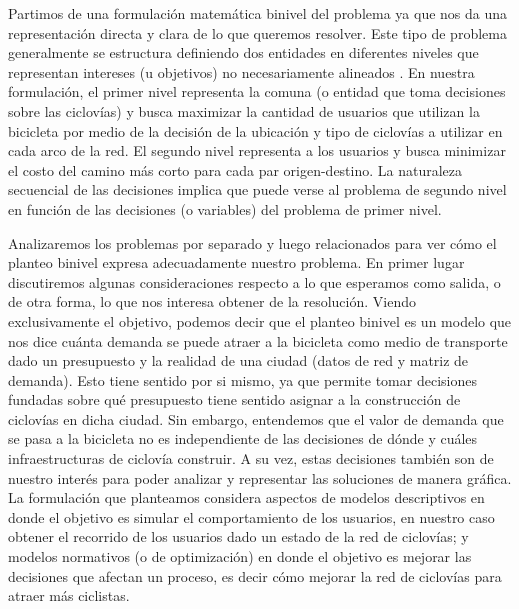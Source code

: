 \documentclass{article}
\begin{document}
  Partimos de una formulación matemática binivel del problema ya que nos da una representación directa y clara de lo que queremos resolver. Este tipo de problema generalmente se estructura definiendo dos entidades en diferentes niveles que representan intereses (u objetivos) no necesariamente alineados \cite{bardbook}. En nuestra formulación, el primer nivel representa la comuna (o entidad que toma decisiones sobre las ciclovías) y busca maximizar la cantidad de usuarios que utilizan la bicicleta por medio de la decisión de la ubicación y tipo de ciclovías a utilizar en cada arco de la red. El segundo nivel representa a los usuarios y busca minimizar el costo del camino más corto para cada par origen-destino. La naturaleza secuencial de las decisiones implica que puede verse al problema de segundo nivel en función de las decisiones (o variables) del problema de primer nivel.

  Analizaremos los problemas por separado y luego relacionados para ver cómo el planteo binivel expresa adecuadamente nuestro problema. En primer lugar discutiremos algunas consideraciones respecto a lo que esperamos como salida, o de otra forma, lo que nos interesa obtener de la resolución. Viendo exclusivamente el objetivo, podemos decir que el planteo binivel es un modelo que nos dice cuánta demanda se puede atraer a la bicicleta como medio de transporte dado un presupuesto y la realidad de una ciudad (datos de red y matriz de demanda). Esto tiene sentido por si mismo, ya que permite tomar decisiones fundadas sobre qué presupuesto tiene sentido asignar a la construcción de ciclovías en dicha ciudad. Sin embargo, entendemos que el valor de demanda que se pasa a la bicicleta no es independiente de las decisiones de dónde y cuáles infraestructuras de ciclovía construir. A su vez, estas decisiones también son de nuestro interés para poder analizar y representar las soluciones de manera gráfica. La formulación que planteamos considera aspectos de modelos descriptivos en donde el objetivo es simular el comportamiento de los usuarios, en nuestro caso obtener el recorrido de los usuarios dado un estado de la red de ciclovías; y modelos normativos (o de optimización) en donde el objetivo es mejorar las decisiones que afectan un proceso, es decir cómo mejorar la red de ciclovías para atraer más ciclistas.
\end{document}
